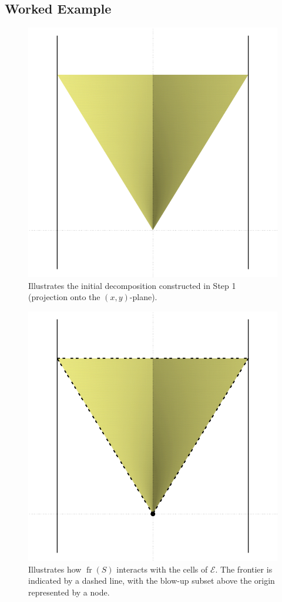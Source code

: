 \documentclass[
]{book}
\theoremstyle{definition}
\theoremstyle{definition}
\theoremstyle{definition}
\theoremstyle{definition}
\theoremstyle{remark}
\begin{document}
\hypertarget{sec:worked-example}{%
\subsection{Worked Example}\label{sec:worked-example}}

\begin{figure}

{\centering \includegraphics[width=0.6\linewidth]{gnuplot/r3-initial} 

}

\caption{Illustrates the initial decomposition constructed in Step 1 (projection onto the $(x,y)$-plane).}\label{fig:initial-cad}
\end{figure}

\begin{figure}

{\centering \includegraphics[width=0.6\linewidth]{gnuplot/r3-initial-fr} 

}

\caption{Illustrates how ${\operatorname{fr} \left( S \right)}$ interacts with the cells of $\mathcal{E}$. The frontier is indicated by a dashed line, with the blow-up subset above the origin represented by a node.}\label{fig:initial-fr}
\end{figure}
\end{document}
